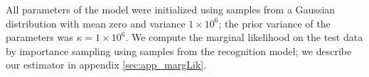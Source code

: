 \documentclass{article}
\renewcommand{\comment}[1]{\textcolor{red}{[#1]}}
\begin{document}
\begin{bibunit}[icml2013]
All parameters of the model were initialized using samples from a Gaussian 
distribution with mean zero and variance $1\times 10^6$; the prior 
variance of the parameters was $\kappa = 1\times 10^6$. We compute the 
marginal likelihood on the test data by importance sampling using samples 
from the recognition model; we describe our estimator in appendix 
\ref{sec:app_margLik}. 
%
%
%
%


\putbib
\end{bibunit}
\end{document}
